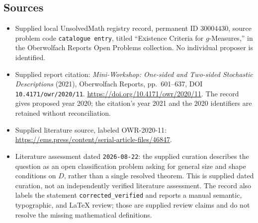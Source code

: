 \documentclass[11pt]{article}
\begin{document}
\subsection{Sources}
\begin{itemize}
\item Supplied local UnsolvedMath registry record, permanent ID \(30004430\), source problem code \texttt{catalogue entry}, titled ``Existence Criteria for \(g\)-Measures,'' in the Oberwolfach Reports Open Problems collection. No individual proposer is identified.
\item Supplied report citation: \emph{Mini-Workshop: One-sided and Two-sided Stochastic Descriptions} (2021), Oberwolfach Reports, pp.\ 601--637, DOI \texttt{10.4171/owr/2020/11}. \url{https://doi.org/10.4171/owr/2020/11}. The record gives proposed year 2020; the citation's year 2021 and the 2020 identifiers are retained without reconciliation.
\item Supplied literature source, labeled OWR-2020-11: \url{https://ems.press/content/serial-article-files/46847}.
\item Literature assessment dated \texttt{2026-08-22}: the supplied curation describes the question as an open classification problem asking for general size and shape conditions on \(D\), rather than a single resolved theorem. This is supplied dated curation, not an independently verified literature assessment. The record also labels the statement \texttt{corrected\_verified} and reports a manual semantic, typographic, and LaTeX review; those are supplied review claims and do not resolve the missing mathematical definitions.
\end{itemize}
\end{document}
